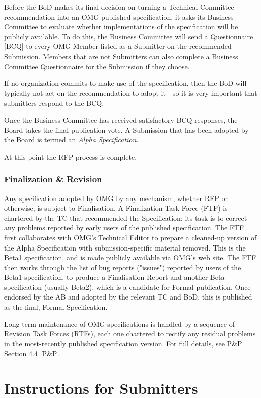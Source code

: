 Before the BoD makes its final decision on turning a Technical Committee recommendation into an OMG published specification, it asks its Business Committee to evaluate whether implementations of the specification will be publicly available. To do this, the Business Committee will send a Questionnaire [BCQ] to every OMG Member listed as a Submitter on the recommended Submission. Members that are not Submitters can also complete a Business Committee Questionnaire for the Submission if they choose.

If no organization commits to make use of the specification, then the BoD will typically not act on the recommendation to adopt it - so it is very important that submitters respond to the BCQ.

Once the Business Committee has received satisfactory BCQ responses, the Board takes the final publication vote. A Submission that has been adopted by the Board is termed an \textit{Alpha Specification}.

At this point the RFP process is complete.


\subsubsection{Finalization \& Revision}

Any specification adopted by OMG by any mechanism, whether RFP or otherwise, is subject to Finalisation. A Finalization Task Force (FTF) is chartered by the TC that recommended the Specification; its task is to correct any problems reported by early users of the published specification. The FTF first collaborates with OMG's Technical Editor to prepare a cleaned-up version of the Alpha Specification with submission-specific material removed. This is the Beta1 specification, and is made publicly available via OMG's web site. The FTF then works through the list of bug reports ("issues") reported by users of the Beta1 specification, to produce a Finalisation Report and another Beta specification (usually Beta2), which is a candidate for Formal publication. Once endorsed by the AB and adopted by the relevant TC and BoD, this is published as the final, Formal Specification.

Long-term maintenance of OMG specifications is handled by a sequence of Revision Task Forces (RTFs), each one chartered to rectify any residual problems in the most-recently published specification version. For full details, see P\&P Section 4.4 [P\&P].


\section{Instructions for Submitters}
